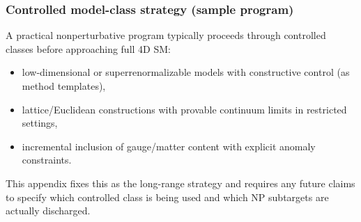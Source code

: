 \subsubsection{Controlled model-class strategy (sample program)}
\AuditTag A practical nonperturbative program typically proceeds through controlled classes before approaching full 4D SM:
\begin{itemize}
\item low-dimensional or superrenormalizable models with constructive control (as method templates),
\item lattice/Euclidean constructions with provable continuum limits in restricted settings,
\item incremental inclusion of gauge/matter content with explicit anomaly constraints.
\end{itemize}
This appendix fixes this as the long-range strategy and requires any future claims to specify which controlled class is being used and which NP subtargets are actually discharged.

